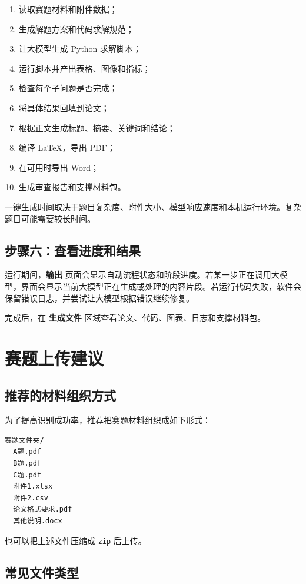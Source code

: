 \documentclass[UTF8,a4paper,12pt]{ctexart}
\newcommand{\menu}[1]{\textbf{#1}}
\begin{document}
\begin{enumerate}
  \item 读取赛题材料和附件数据；
  \item 生成解题方案和代码求解规范；
  \item 让大模型生成 Python 求解脚本；
  \item 运行脚本并产出表格、图像和指标；
  \item 检查每个子问题是否完成；
  \item 将具体结果回填到论文；
  \item 根据正文生成标题、摘要、关键词和结论；
  \item 编译 LaTeX，导出 PDF；
  \item 在可用时导出 Word；
  \item 生成审查报告和支撑材料包。
\end{enumerate}

一键生成时间取决于题目复杂度、附件大小、模型响应速度和本机运行环境。复杂题目可能需要较长时间。

\subsection{步骤六：查看进度和结果}

运行期间，\menu{输出} 页面会显示自动流程状态和阶段进度。若某一步正在调用大模型，界面会显示当前大模型正在生成或处理的内容片段。若运行代码失败，软件会保留错误日志，并尝试让大模型根据错误继续修复。

完成后，在 \menu{生成文件} 区域查看论文、代码、图表、日志和支撑材料包。

\section{赛题上传建议}

\subsection{推荐的材料组织方式}

为了提高识别成功率，推荐把赛题材料组织成如下形式：

\begin{verbatim}
赛题文件夹/
  A题.pdf
  B题.pdf
  C题.pdf
  附件1.xlsx
  附件2.csv
  论文格式要求.pdf
  其他说明.docx
\end{verbatim}

也可以把上述文件压缩成 \texttt{zip} 后上传。

\subsection{常见文件类型}
\end{document}
